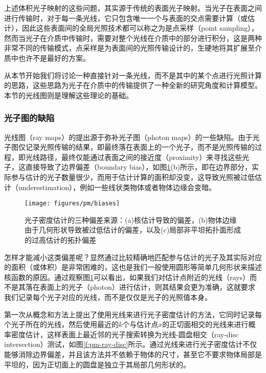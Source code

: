 上述体积光子映射的这些问题，其实源于传统的表面光子映射。当光子在表面之间进行传输时，对于每一条光线，它只包含唯一一个与表面的交点需要计算（或估计），因此这些表面间的全局光照技术都可以称之为是点采样（point sampling），然而当光子在介质中传输时，需要对整个光线在介质中的部分进行积分，这是两种非常不同的传输模式，点采样是为表面间的光照传输设计的，生硬地将其扩展至介质中也许不是最好的方案。

从本节开始我们将讨论一种直接针对一条光线，而不是其中的某个点进行光照计算的思路，这些思路为光子在介质中的传输提供了一种全新的研究角度和计算模型。本节的光线图则是理解这些理论的基础。




\subsubsection{光子图的缺陷}
光线图（ray maps）\cite{a:RayMapsforGlobalIllumination}的提出源于弥补光子图（photon maps）的一些缺陷。由于光子图仅记录光照传输的结果，即最终落在表面上的一个光子，而不是光照传输的过程，即光线路径，最终仅能通过表面之间的接近度（proximity）来寻找这些光子，这直接导致了边界偏差（boundary bias），如图\ref{f:pm-biases}(b)所示，即在边界部分，实际参与估计的光子数量很少，而用于估计计算的面积却没变，这导致光照被过低估计（underestimation），例如一些线状类物体或者物体边缘会变暗。

\begin{figure}
	\texttt{[image: figures/pm/biases]}
	\caption{光子密度估计的三种偏差来源：(a)核估计导致的偏差，(b)物体边缘由于几何形状导致被过低估计的偏差，以及(c)局部非平坦拓扑面形成的过高估计的拓扑偏差}
	\label{f:pm-biases}
\end{figure}

怎样才能减小这类偏差呢？显然通过比较精确地匹配参与估计的光子及其实际对应的面积（或体积）是非常困难的，这也是我们一般使用圆形等简单几何形状来描述核函数的原因。通过观察图\ref{f:pm-biases}可以看出，如果我们对估计点附近的光线（rays）而不是其落在表面上的光子（photon）进行估计，则其结果会更为准确，这就要求我们记录每个光子对应的光线，而不是仅仅是光子的光照值本身。

\cite{a:AParticlePathbasedMethodforMonteCarloDensityEstimation}第一次从概念和方法上提出了使用光线来进行光子密度估计的方法，它同时记录每个光子所在的光线，然后使用最近的$k$个与估计点$x$的正切面相交的光线来进行概率密度估计，这样表面上最近邻的光子搜索转换为光线-圆盘相交（ray-disc intersection）测试，如图\ref{f:pm-ray-disc}所示。通过光线来进行光子密度估计不仅能够消除边界偏差，并且该方法并不依赖于物体的尺寸，甚至它不要求物体局部是平坦的，因为正切面上的圆盘是独立于其局部几何形状的。

